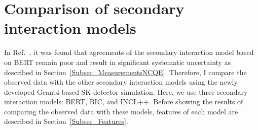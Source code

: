 
%
%

\section{Comparison of secondary interaction models}\label{Sec_Model}
\vs\hs
In Ref.~\cite{2014Abe,2019Abe}, it was found that agreements of the secondary interaction model based on BERT remain poor and result in significant systematic uncertainty as described in Section~\ref{Subsec_MeasurementsNCQE}.
Therefore, I compare the observed data with the other secondary interaction models using the newly developed Geant4-based SK detector simulation.
Here, we use three secondary interaction models: BERT, BIC, and INCL++.
Before showing the results of comparing the observed data with these models, features of each model are described in Section~\ref{Subsec_Features}.





